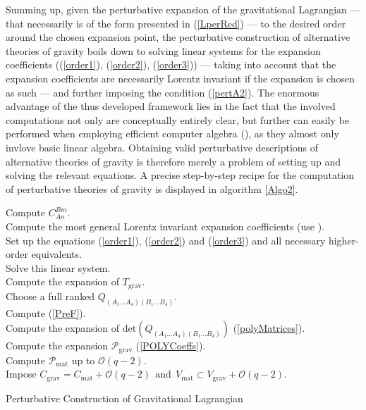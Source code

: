 \documentclass[%
 reprint,
nofootinbib,
 amsmath,amssymb,
 aps,
 prd,
floatfix,
]{revtex4-2}
\begin{document}
Summing up, given the perturbative expansion of the gravitational Lagrangian --- that necessarily is of the form presented in (\ref{LperRed}) --- to the desired order around the chosen expansion point, the perturbative construction of alternative theories of gravity boils down to solving linear systems for the expansion coefficients ((\ref{order1}), (\ref{order2}), (\ref{order3})) --- taking into account that the expansion coefficients are necessarily Lorentz invariant if the expansion is chosen as such --- and further imposing the condition
(\ref{pertA2}). The enormous advantage of the thus developed framework lies in the fact that the involved computations not only are conceptually entirely clear, but further can easily be performed when employing efficient computer algebra (\cite{sparse-tensor}), as they almost only invlove basic linear algebra. Obtaining valid perturbative descriptions of alternative theories of gravity is therefore merely a problem of setting up and solving the relevant equations. A precise step-by-step recipe for the computation of perturbative theories of gravity is displayed in algorithm \ref{Algo2}.
\begin{algorithm}[hbt!]
\SetAlgoLined
{}
Compute $C^{Bm}_{An}$. \\
Compute the most general Lorentz invariant expansion coefficients (use \cite{sparse-tensor}).\\
Set up the equations (\ref{order1}), (\ref{order2}) and (\ref{order3}) and all necessary higher-order equivalents.\\
Solve this linear system. \\
Compute the expansion of $T_{\text{grav}}$.\\
Choose a full ranked $Q_{(A_1...A_4)(B_1...B_4)}$. \\
Compute (\ref{PreF}).\\
Compute the expansion of $\mathrm{det}(Q_{(A_1...A_4)(B_1...B_4)})$ (\ref{polyMatrices}). \\
Compute the expansion $\mathcal{P}_{\text{grav}}$ (\ref{POLYCoeffs}). \\
Compute $\mathcal{P}_{\text{mat}}$ up to $\mathcal{O}(q-2)$.\\
Impose $C_{\text{grav}} = C_{\text{mat}} + \mathcal{O}(q-2) \ \ \text{and} \ \ V_{\text{mat}} \subset V_{\text{grav}} + \mathcal{O}(q-2)$.
 \caption{Perturbative Construction of Gravitational Lagrangian}\label{Algo2}
\end{algorithm}
\end{document}
